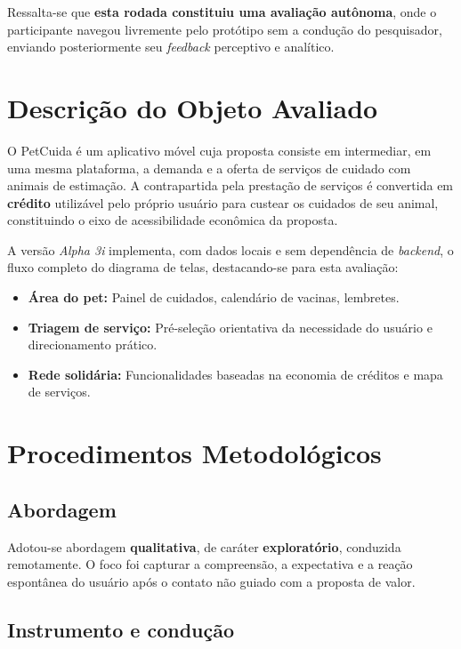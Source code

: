 \documentclass[12pt,a4paper]{article}
\begin{document}
Ressalta-se que \textbf{esta rodada constituiu uma avaliação autônoma}, onde o participante navegou livremente pelo protótipo sem a condução do pesquisador, enviando posteriormente seu \textit{feedback} perceptivo e analítico.

\section{Descrição do Objeto Avaliado}

O PetCuida é um aplicativo móvel cuja proposta consiste em intermediar, em uma mesma plataforma, a demanda e a oferta de serviços de cuidado com animais de estimação. A contrapartida pela prestação de serviços é convertida em \textbf{crédito} utilizável pelo próprio usuário para custear os cuidados de seu animal, constituindo o eixo de acessibilidade econômica da proposta.

A versão \textit{Alpha 3i} implementa, com dados locais e sem dependência de \textit{backend}, o fluxo completo do diagrama de telas, destacando-se para esta avaliação:

\begin{itemize}[leftmargin=*]
    \item \textbf{Área do pet:} Painel de cuidados, calendário de vacinas, lembretes.
    \item \textbf{Triagem de serviço:} Pré-seleção orientativa da necessidade do usuário e direcionamento prático.
    \item \textbf{Rede solidária:} Funcionalidades baseadas na economia de créditos e mapa de serviços.
\end{itemize}

\section{Procedimentos Metodológicos}

\subsection{Abordagem}

Adotou-se abordagem \textbf{qualitativa}, de caráter \textbf{exploratório}, conduzida remotamente. O foco foi capturar a compreensão, a expectativa e a reação espontânea do usuário após o contato não guiado com a proposta de valor.

\subsection{Instrumento e condução}
\end{document}
